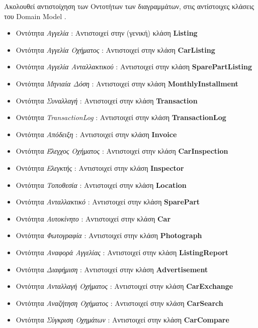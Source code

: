 \documentclass{../ol-softwaremanual}
\begin{document}
	Ακολουθεί αντιστοίχηση των Οντοτήτων των διαγραμμάτων, στις αντίστοιχες κλάσεις του \en Domain Model \gr.
	
	\begin{itemize}
		\item Οντότητα \textit{Αγγελία} : Αντιστοιχεί στην (γενική) κλάση \en \textbf{Listing}\gr
		\item Οντότητα \textit{Αγγελία Οχήματος} : Αντιστοιχεί στην κλάση \en \textbf{CarListing}\gr
		\item Οντότητα \textit{Αγγελία Ανταλλακτικού} : Αντιστοιχεί στην κλάση \en \textbf{SparePartListing}\gr
		\item Οντότητα \textit{Μηνιαία Δόση} : Αντιστοιχεί στην κλάση \en\textbf{MonthlyInstallment}\gr
		\item Οντότητα \textit{Συναλλαγή} : Αντιστοιχεί στην κλάση \en \textbf{Transaction}\gr
		\item Οντότητα \en \textit{TransactionLog} \gr : Αντιστοιχεί στην κλάση \en \textbf{TransactionLog}\gr
		\item Οντότητα \textit{Απόδειξη} : Αντιστοιχεί στην κλάση \en \textbf{Invoice}\gr
		\item Οντότητα \textit{Έλεγχος Οχήματος} : Αντιστοιχεί στην κλάση \en \textbf{CarInspection}\gr
		\item Οντότητα \textit{Ελεγκτής} : Αντιστοιχεί στην κλάση \en \textbf{Inspector}\gr
		\item Οντότητα \textit{Τοποθεσία} : Αντιστοιχεί στην κλάση \en \textbf{Location}\gr
		\item Οντότητα \textit{Ανταλλακτικό} : Αντιστοιχεί στην κλάση \en \textbf{SparePart}\gr
		\item Οντότητα \textit{Αυτοκίνητο} : Αντιστοιχεί στην κλάση \en \textbf{Car}\gr
		\item Οντότητα \textit{Φωτογραφία} : Αντιστοιχεί στην κλάση \en \textbf{Photograph}\gr
		\item Οντότητα \textit{Αναφορά Αγγελίας} : Αντιστοιχεί στην κλάση \en \textbf{ListingReport}\gr
		\item Οντότητα \textit{Διαφήμιση} : Αντιστοιχεί στην κλάση \en \textbf{Advertisement}\gr
		\item Οντότητα \textit{Ανταλλαγή Οχήματος} : Αντιστοιχεί στην κλάση \en \textbf{CarExchange}\gr
		\item Οντότητα \textit{Αναζήτηση Οχήματος} : Αντιστοιχεί στην κλάση \en \textbf{CarSearch}\gr
		\item Οντότητα \textit{Σύγκριση Οχημάτων} : Αντιστοιχεί στην κλάση \en \textbf{CarCompare}\gr

\end{itemize}
\end{document}

